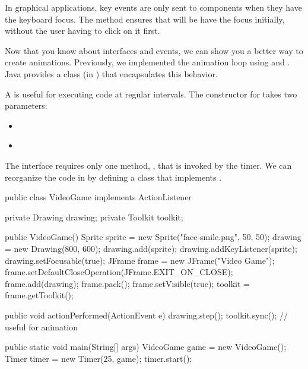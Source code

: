 In graphical applications, key events are only sent to components when they have the keyboard focus.
The  method ensures that  will be have the focus initially, without the user having to click on it first.


Now that you know about interfaces and events, we can show you a better way to create animations.
Previously, we implemented the animation loop using  and .
Java provides a  class (in ) that encapsulates this behavior.

A  is useful for executing code at regular intervals.
The constructor for  takes two parameters:

\begin{itemize}
\item {} {\tt ~~~~~~~~~~~~~~~} 

\item {} {\tt ~} 
\end{itemize}

The  interface requires only one method, , that is invoked by the timer.
We can reorganize the code in  by defining a class that implements .

\begin{code}
public class VideoGame implements ActionListener {
    private Drawing drawing;
    private Toolkit toolkit;

    public VideoGame() {
        Sprite sprite = new Sprite("face-smile.png", 50, 50);
        drawing = new Drawing(800, 600);
        drawing.add(sprite);
        drawing.addKeyListener(sprite);
        drawing.setFocusable(true);
        JFrame frame = new JFrame("Video Game");
        frame.setDefaultCloseOperation(JFrame.EXIT_ON_CLOSE);
        frame.add(drawing);
        frame.pack();
        frame.setVisible(true);
        toolkit = frame.getToolkit();
    }

    public void actionPerformed(ActionEvent e) {
        drawing.step();
        toolkit.sync();  // useful for animation
    }

    public static void main(String[] args) {
        VideoGame game = new VideoGame();
        Timer timer = new Timer(25, game);
        timer.start();
    }
}
\end{code}


